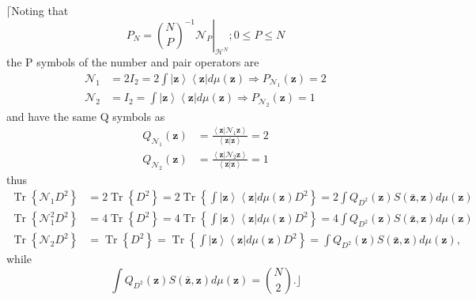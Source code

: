\documentclass[aps,preprint]{revtex4}%
\begin{document}
$\lceil$Noting that
\begin{equation}
P_{N}=\left.  \binom{N}{P}^{-1}\mathcal{N}_{P}\right\vert _{\mathcal{H}^{N}%
};0\leq P\leq N
\end{equation}
the P symbols of the number and pair operators are
\begin{align}
\mathcal{N}_{1}  &  =2I_{2}=2\int\left\vert \mathbf{z}\right\rangle
\left\langle \mathbf{z}\right\vert d\mu\left(  \mathbf{z}\right)  \Rightarrow
P_{\mathcal{N}_{1}}\left(  \mathbf{z}\right)  =2\nonumber\\
\mathcal{N}_{2}  &  =I_{2}=\int\left\vert \mathbf{z}\right\rangle \left\langle
\mathbf{z}\right\vert d\mu\left(  \mathbf{z}\right)  \Rightarrow
P_{\mathcal{N}_{2}}\left(  \mathbf{z}\right)  =1
\end{align}
and have the same Q symbols as
\begin{align*}
Q_{\mathcal{N}_{1}}\left(  \mathbf{z}\right)   &  =\frac{\left\langle
\mathbf{z}\left\vert \mathcal{N}_{1}\mathbf{z}\right.  \right\rangle
}{\left\langle \mathbf{z}\left\vert \mathbf{z}\right.  \right\rangle }=2\\
Q_{\mathcal{N}_{2}}\left(  \mathbf{z}\right)   &  =\frac{\left\langle
\mathbf{z}\left\vert \mathcal{N}_{2}\mathbf{z}\right.  \right\rangle
}{\left\langle \mathbf{z}\left\vert \mathbf{z}\right.  \right\rangle }=1
\end{align*}
thus
\begin{align}
\operatorname*{Tr}\left\{  \mathcal{N}_{1}D^{2}\right\}   &
=2\operatorname*{Tr}\left\{  D^{2}\right\}  =2\operatorname*{Tr}\left\{
\int\left\vert \mathbf{z}\right\rangle \left\langle \mathbf{z}\right\vert
d\mu\left(  \mathbf{z}\right)  D^{2}\right\}  =2\int Q_{D^{2}}\left(
\mathbf{z}\right)  S\left(  \mathbf{\bar{z},z}\right)  d\mu\left(
\mathbf{z}\right) \nonumber\\
\operatorname*{Tr}\left\{  \mathcal{N}_{1}^{2}D^{2}\right\}   &
=4\operatorname*{Tr}\left\{  D^{2}\right\}  =4\operatorname*{Tr}\left\{
\int\left\vert \mathbf{z}\right\rangle \left\langle \mathbf{z}\right\vert
d\mu\left(  \mathbf{z}\right)  D^{2}\right\}  =4\int Q_{D^{2}}\left(
\mathbf{z}\right)  S\left(  \mathbf{\bar{z},z}\right)  d\mu\left(
\mathbf{z}\right) \nonumber\\
\operatorname*{Tr}\left\{  \mathcal{N}_{2}D^{2}\right\}   &
=\operatorname*{Tr}\left\{  D^{2}\right\}  =\operatorname*{Tr}\left\{
\int\left\vert \mathbf{z}\right\rangle \left\langle \mathbf{z}\right\vert
d\mu\left(  \mathbf{z}\right)  D^{2}\right\}  =\int Q_{D^{2}}\left(
\mathbf{z}\right)  S\left(  \mathbf{\bar{z},z}\right)  d\mu\left(
\mathbf{z}\right)  ,
\end{align}
while%
\begin{equation}
\int Q_{D^{2}}\left(  \mathbf{z}\right)  S\left(  \mathbf{\bar{z},z}\right)
d\mu\left(  \mathbf{z}\right)  =\binom{N}{2}.\rfloor
\end{equation}
\end{document}
